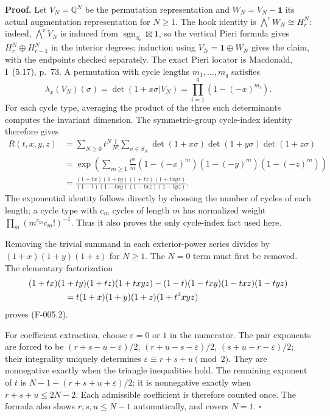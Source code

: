 \textbf{Proof.}
Let $V_N=\mathbb Q^N$ be the permutation representation and
$W_N=V_N-\mathbf1$ its actual augmentation representation for $N\geq1$.
The hook identity is $\bigwedge^rW_N\cong H_r^N$: indeed,
$\bigwedge^rV_N$ is induced from $\operatorname{sgn}_{S_r}\boxtimes\mathbf1$,
so the vertical Pieri formula gives $H_r^N\oplus H_{r-1}^N$ in the
interior degrees; induction using $V_N=\mathbf1\oplus W_N$ gives the
claim, with the endpoints checked separately. The exact Pieri locator is
Macdonald, I~(5.17), p.~73.
A permutation with cycle lengths $m_1,\ldots,m_q$ satisfies
\[
 \lambda_x(V_N)(\sigma)=\det(1+x\sigma|V_N)
 =\prod_{i=1}^q(1-(-x)^{m_i}).
\]
For each cycle type, averaging the product of the three such determinants
computes the invariant dimension. The symmetric-group cycle-index identity
therefore gives
\begin{align*}
 R(t,x,y,z)
 &=\sum_{N\geq0}t^N\frac1{N!}\sum_{\sigma\in S_N}
   \det(1+x\sigma)\det(1+y\sigma)\det(1+z\sigma)\\
 &=\exp\left(\sum_{m\geq1}\frac{t^m}{m}
 (1-(-x)^m)(1-(-y)^m)(1-(-z)^m)\right)\\
 &=\frac{(1+tx)(1+ty)(1+tz)(1+txyz)}
 {(1-t)(1-txy)(1-txz)(1-tyz)}.
\end{align*}
The exponential identity follows directly by choosing the number of cycles
of each length; a cycle type with $c_m$ cycles of length $m$ has normalized
weight $\prod_m(m^{c_m}c_m!)^{-1}$. Thus it also proves the only cycle-index
fact used here.

Removing the trivial summand in each exterior-power series divides by
$(1+x)(1+y)(1+z)$ for $N\geq1$. The $N=0$ term must first be removed.
The elementary factorization
\begin{align*}
 &(1+tx)(1+ty)(1+tz)(1+txyz)
 -(1-t)(1-txy)(1-txz)(1-tyz)\\
 &\hspace{15mm}=t(1+x)(1+y)(1+z)(1+t^2xyz)
\end{align*}
proves (F-005.2).

For coefficient extraction, choose $\varepsilon=0$ or $1$ in the numerator.
The pair exponents are forced to be
$(r+s-u-\varepsilon)/2$, $(r+u-s-\varepsilon)/2$,
$(s+u-r-\varepsilon)/2$; their integrality uniquely determines
$\varepsilon\equiv r+s+u\pmod2$.
They are nonnegative exactly when the triangle inequalities hold. The
remaining exponent of $t$ is
$N-1-(r+s+u+\varepsilon)/2$; it is nonnegative exactly when
$r+s+u\leq2N-2$. Each admissible coefficient is therefore counted once.
The formula also shows $r,s,u\leq N-1$ automatically, and covers $N=1$.
\hfill$\square$

